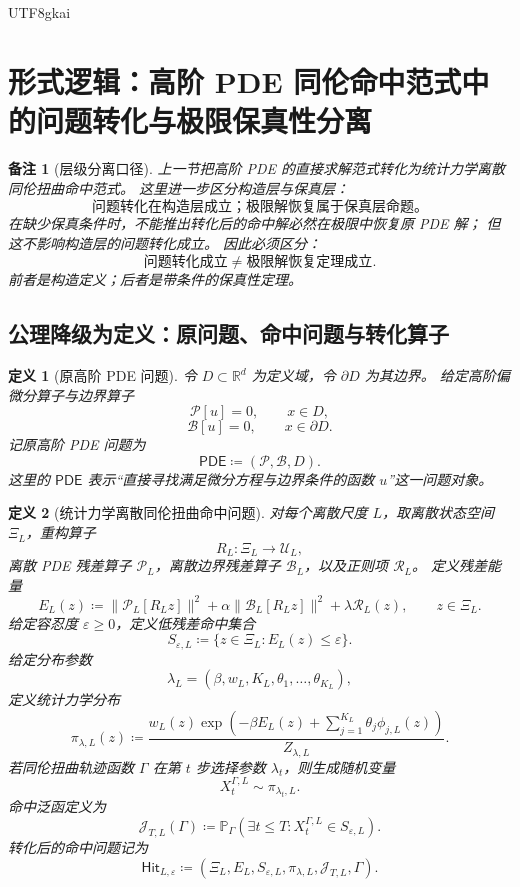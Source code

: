 \documentclass[12pt]{article}
\newtheorem{definition}{定义}[section]
\newtheorem{remark}{备注}[section]
\newcommand{\RR}{\mathbb{R}}
\newcommand{\DefEq}{\coloneqq}
\begin{document}
\begin{CJK*}{UTF8}{gkai}
\clearpage

\section{形式逻辑：高阶 PDE 同伦命中范式中的问题转化与极限保真性分离}
\label{sec:tex55-pde-transformation-fidelity-separation}

\begin{remark}[层级分离口径]
上一节把高阶 PDE 的直接求解范式转化为统计力学离散同伦扭曲命中范式。
这里进一步区分构造层与保真层：
\[
  \boxed{
  \text{问题转化在构造层成立；极限解恢复属于保真层命题。}
  }
\]
在缺少保真条件时，不能推出转化后的命中解必然在极限中恢复原 PDE 解；
但这不影响构造层的问题转化成立。
因此必须区分：
\[
  \boxed{
  \text{问题转化成立}
  \neq
  \text{极限解恢复定理成立}.
  }
\]
前者是构造定义；后者是带条件的保真性定理。
\end{remark}

\subsection{公理降级为定义：原问题、命中问题与转化算子}
\label{subsec:tex55-transformation-definitions}

\begin{definition}[原高阶 PDE 问题]
\label{def:tex55-transform-original-pde}
令 \(D\subset\RR^d\) 为定义域，令 \(\partial D\) 为其边界。
给定高阶偏微分算子与边界算子
\[
  \mathcal P[u]=0,\qquad x\in D,
\]
\[
  \mathcal B[u]=0,\qquad x\in\partial D.
\]
记原高阶 PDE 问题为
\[
  \mathsf{PDE}
  \DefEq
  (\mathcal P,\mathcal B,D).
\]
这里的 \(\mathsf{PDE}\) 表示“直接寻找满足微分方程与边界条件的函数 \(u\)”这一问题对象。
\end{definition}

\begin{definition}[统计力学离散同伦扭曲命中问题]
\label{def:tex55-transform-hit-problem}
对每个离散尺度 \(L\)，取离散状态空间 \(\Xi_L\)，重构算子
\[
  R_L:\Xi_L\longrightarrow\mathcal U_L,
\]
离散 PDE 残差算子 \(\mathcal P_L\)，离散边界残差算子 \(\mathcal B_L\)，以及正则项 \(\mathcal R_L\)。
定义残差能量
\[
  E_L(z)
  \DefEq
  \lVert \mathcal P_L[R_Lz]\rVert^2
  +\alpha\lVert \mathcal B_L[R_Lz]\rVert^2
  +\lambda\mathcal R_L(z),
  \qquad z\in\Xi_L.
\]
给定容忍度 \(\varepsilon\ge0\)，定义低残差命中集合
\[
  S_{\varepsilon,L}
  \DefEq
  \{z\in\Xi_L:E_L(z)\le\varepsilon\}.
\]
给定分布参数
\[
  \lambda_L=(\beta,w_L,K_L,\theta_1,\dots,\theta_{K_L}),
\]
定义统计力学分布
\[
  \pi_{\lambda,L}(z)
  \DefEq
  \frac{
  w_L(z)
  \exp\!\left(
  -\beta E_L(z)
  +\sum_{j=1}^{K_L}\theta_j\phi_{j,L}(z)
  \right)
  }{
  Z_{\lambda,L}
  }.
\]
若同伦扭曲轨迹函数 \(\Gamma\) 在第 \(t\) 步选择参数 \(\lambda_t\)，则生成随机变量
\[
  X_t^{\Gamma,L}\sim\pi_{\lambda_t,L}.
\]
命中泛函定义为
\[
  \mathcal J_{T,L}(\Gamma)
  \DefEq
  \mathbb P_\Gamma
  \left(
  \exists t\le T:
  X_t^{\Gamma,L}\in S_{\varepsilon,L}
  \right).
\]
转化后的命中问题记为
\[
  \mathsf{Hit}_{L,\varepsilon}
  \DefEq
  (\Xi_L,E_L,S_{\varepsilon,L},\pi_{\lambda,L},\mathcal J_{T,L},\Gamma).
\]
\end{definition}


\end{CJK*}
\end{document}
